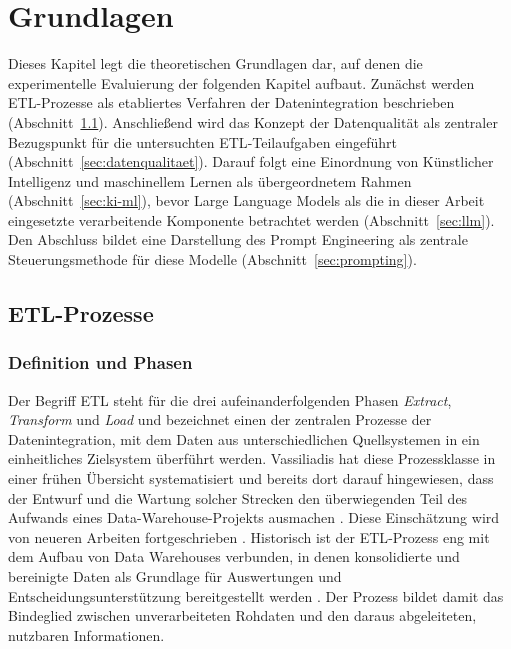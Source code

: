 ﻿%

\chapter{Grundlagen}
\label{ch:grundlagen}

Dieses Kapitel legt die theoretischen Grundlagen dar, auf denen die experimentelle Evaluierung der folgenden Kapitel aufbaut. Zunächst werden \ac{ETL}-Prozesse als etabliertes Verfahren der Datenintegration beschrieben (Abschnitt~\ref{sec:etl}). Anschließend wird das Konzept der Datenqualität als zentraler Bezugspunkt für die untersuchten \ac{ETL}-Teilaufgaben eingeführt (Abschnitt~\ref{sec:datenqualitaet}). Darauf folgt eine Einordnung von Künstlicher Intelligenz und maschinellem Lernen als übergeordnetem Rahmen (Abschnitt~\ref{sec:ki-ml}), bevor Large Language Models als die in dieser Arbeit eingesetzte verarbeitende Komponente betrachtet werden (Abschnitt~\ref{sec:llm}). Den Abschluss bildet eine Darstellung des Prompt Engineering als zentrale Steuerungsmethode für diese Modelle (Abschnitt~\ref{sec:prompting}).

\section{ETL-Prozesse}
\label{sec:etl}

\subsection{Definition und Phasen}
\label{subsec:etl-phasen}

Der Begriff \ac{ETL} steht für die drei aufeinanderfolgenden Phasen \emph{Extract}, \emph{Transform} und \emph{Load} und bezeichnet einen der zentralen Prozesse der Datenintegration, mit dem Daten aus unterschiedlichen Quellsystemen in ein einheitliches Zielsystem überführt werden. Vassiliadis hat diese Prozessklasse in einer frühen Übersicht systematisiert und bereits dort darauf hingewiesen, dass der Entwurf und die Wartung solcher Strecken den überwiegenden Teil des Aufwands eines Data-Warehouse-Projekts ausmachen \autocite{vassiliadisSurveyETL2009}. Diese Einschätzung wird von neueren Arbeiten fortgeschrieben \autocite{khanOverviewETLTechniques2024,walhaDataIntegrationTraditional2024}. Historisch ist der \ac{ETL}-Prozess eng mit dem Aufbau von Data Warehouses verbunden, in denen konsolidierte und bereinigte Daten als Grundlage für Auswertungen und Entscheidungsunterstützung bereitgestellt werden \autocite{khanOverviewETLTechniques2024,boulahiaMulticriteriaEvaluationResearch2024}. Der Prozess bildet damit das Bindeglied zwischen unverarbeiteten Rohdaten und den daraus abgeleiteten, nutzbaren Informationen.

